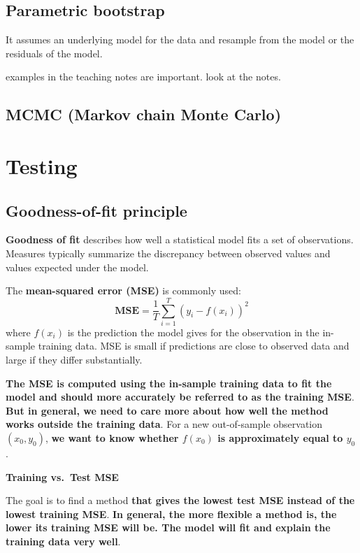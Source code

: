 \documentclass[12pt,a4paper]{article}
\begin{document}
\subsection{Parametric bootstrap}
It assumes an underlying model for the data and resample from the model or the residuals of the model.

examples in the teaching notes are important. look at the notes.


\subsection{MCMC (Markov chain Monte Carlo)}


\section{Testing}

\subsection{Goodness-of-fit principle}

\textbf{Goodness of fit} describes how well a statistical model fits a set of observations. Measures typically summarize the discrepancy between observed values and values expected under the model.

\vspace{0.5em}

The \textbf{mean-squared error (MSE)} is commonly used:
\[
\mathbf{\text{MSE}} = \frac{1}{T} \sum_{i=1}^{T} (y_i - f(x_i))^2
\]
where $f(x_i)$ is the prediction the model gives for the observation in the in-sample training data. MSE is small if predictions are close to observed data and large if they differ substantially.

\vspace{0.5em}

\textbf{The MSE is computed using the in-sample training data to fit the model and should more accurately be referred to as the training MSE}. \textbf{But in general, we need to care more about how well the method works outside the training data}. For a new out-of-sample observation $(x_0, y_0)$, \textbf{we want to know whether $f(x_0)$ is approximately equal to $y_0$}.

\vspace{0.5em}

\textbf{Training vs.\ Test MSE}

The goal is to find a method \textbf{that gives the lowest test MSE instead of the lowest training MSE}. \textbf{In general, the more flexible a method is, the lower its training MSE will be. The model will fit and explain the training data very well}.
\end{document}
